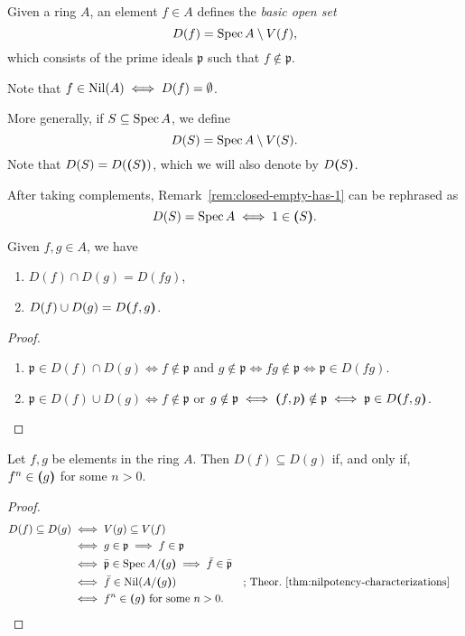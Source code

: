 \begin{ntn}
    Given a ring\/ $A$, an element\/ $f\in A$ defines the \textsl{basic open set}
    $$
        D(f) = \operatorname{Spec} A\setminus V(f),
    $$
    which consists of the prime ideals\/ $\mathfrak p$ such that\/ $f\notin\mathfrak p$.

    Note that\/ $f\in\operatorname{Nil}(A)\iff D(f)=\emptyset$.

    More generally, if\/ $S\subseteq\operatorname{Spec} A$, we define
    $$
        D(S) = \operatorname{Spec} A\setminus V(S).
    $$
    Note that\/ $D(S)=D(\textrm{\boldmath$($}S\textrm{\boldmath$)$})$, which we will also denote by\/ $D\textrm{\boldmath$($}S\textrm{\boldmath$)$}$.
\end{ntn}

\begin{rem}\label{rem:D(S)=Spec(A)-iff-1-in-(S)}
    After taking complements, Remark~\ref{rem:closed-empty-has-1} can be rephrased as
    $$
        D(S)=\operatorname{Spec} A\iff 1\in\textrm{\boldmath$($}S\textrm{\boldmath$)$}.
    $$
\end{rem}

\begin{lem}\label{lem:D-morgan}
    Given\/ $f,g\in A$, we have
    \begin{enumerate}[\rm a)]
        \item $D(f)\cap D(g)=D(fg)$,
        \item $D(f)\cup D(g)=D\textrm{\boldmath$($}f,g\textrm{\boldmath$)$}$.
    \end{enumerate}
\end{lem}

\begin{proof}${}$
    \begin{enumerate}[\rm a)]
        \item $\mathfrak p\in D(f)\cap D(g)\iff f\notin\mathfrak p$ and $g\notin\mathfrak p\iff fg\notin\mathfrak p\iff\mathfrak p\in D(fg)$.

        \item $\mathfrak p\in D(f)\cup D(g)
            \iff f\notin\mathfrak p$ or $g\notin\mathfrak p
            \iff \textrm{\boldmath$($}f,p\textrm{\boldmath$)$}\notin\mathfrak p
            \iff \mathfrak p\in D\textrm{\boldmath$($}f,g\textrm{\boldmath$)$}$.
    \end{enumerate}
\end{proof}

\begin{lem}\label{lem:D(f)-subseteq-D(g)}
    Let\/ $f, g$ be elements in the ring $A$. Then\/ $D(f) \subseteq D(g)$ if, and only if, $f^n\in\textrm{\boldmath$($}g\textrm{\boldmath$)$}$ for some\/ $n > 0$.
\end{lem}

\begin{proof}
    \begin{align*}
        D(f)\subseteq D(g) &\iff V(g)\subseteq V(f)\\
            &\iff g\in\mathfrak p\implies f\in\mathfrak p\\
            &\iff \bar{\mathfrak p}\in\operatorname{Spec} A/\textrm{\boldmath$($}g\textrm{\boldmath$)$}
                \implies\bar f\in\bar{\mathfrak p}\\
            &\iff \bar f\in\operatorname{Nil}(A/\textrm{\boldmath$($}g\textrm{\boldmath$)$})
                &&\text{; Theor.~\ref{thm:nilpotency-characterizations}}\\
            &\iff f^n\in\textrm{\boldmath$($}g\textrm{\boldmath$)$}\text{ for some }n>0.
    \end{align*}
\end{proof}


